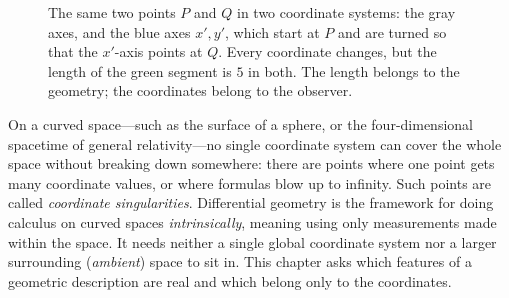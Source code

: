 \begin{figure}[htbp]
\centering
{}
\caption{The same two points $P$ and $Q$ in two coordinate systems: the gray axes, and the blue axes $x', y'$, which start at $P$ and are turned so that the $x'$-axis points at $Q$. Every coordinate changes, but the length of the green segment is $5$ in both. The length belongs to the geometry; the coordinates belong to the observer.}\label{geom:fig-two-grids}
\end{figure}

On a curved space---such as the surface of a sphere, or the four-dimensional spacetime of general relativity---no single coordinate system can cover the whole space without breaking down somewhere: there are points where one point gets many coordinate values, or where formulas blow up to infinity. Such points are called \emph{coordinate singularities}. Differential geometry is the framework for doing calculus on curved spaces \emph{intrinsically}, meaning using only measurements made within the space. It needs neither a single global coordinate system nor a larger surrounding (\emph{ambient}) space to sit in. This chapter asks which features of a geometric description are real and which belong only to the coordinates.

